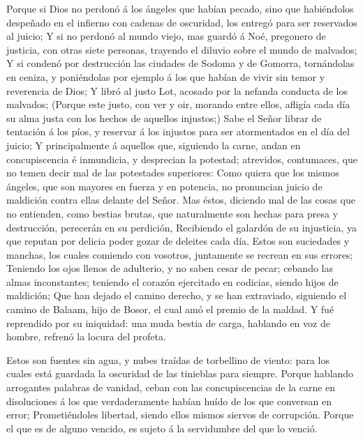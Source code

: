  Porque si Dios no perdonó á los ángeles que habían pecado,
sino que habiéndolos despeñado en el infierno con cadenas de oscuridad,
los entregó para ser reservados al juicio;  Y si no perdonó
al mundo viejo, mas guardó á Noé, pregonero de justicia, con otras siete
personas, trayendo el diluvio sobre el mundo de malvados;  Y
si condenó por destrucción las ciudades de Sodoma y de Gomorra,
tornándolas en ceniza, y poniéndolas por ejemplo á los que habían de
vivir sin temor y reverencia de Dios;  Y libró al justo Lot,
acosado por la nefanda conducta de los malvados;  (Porque
este justo, con ver y oir, morando entre ellos, afligía cada día su alma
justa con los hechos de aquellos injustos;)  Sabe el Señor
librar de tentación á los píos, y reservar á los injustos para ser
atormentados en el día del juicio;  Y principalmente á
aquellos que, siguiendo la carne, andan en concupiscencia é inmundicia,
y desprecian la potestad; atrevidos, contumaces, que no temen decir mal
de las potestades superiores:  Como quiera que los mismos
ángeles, que son mayores en fuerza y en potencia, no pronuncian juicio
de maldición contra ellas delante del Señor.  Mas éstos,
diciendo mal de las cosas que no entienden, como bestias brutas, que
naturalmente son hechas para presa y destrucción, perecerán en su
perdición,  Recibiendo el galardón de su injusticia, ya que
reputan por delicia poder gozar de deleites cada día. Estos son
suciedades y manchas, los cuales comiendo con vosotros, juntamente se
recrean en sus errores;  Teniendo los ojos llenos de
adulterio, y no saben cesar de pecar; cebando las almas inconstantes;
teniendo el corazón ejercitado en codicias, siendo hijos de maldición;
 Que han dejado el camino derecho, y se han extraviado,
siguiendo el camino de Balaam, hijo de Bosor, el cual amó el premio de
la maldad.  Y fué reprendido por su iniquidad: una muda
bestia de carga, hablando en voz de hombre, refrenó la locura del
profeta.

 Estos son fuentes sin agua, y nubes traídas de torbellino
de viento: para los cuales está guardada la oscuridad de las tinieblas
para siempre.  Porque hablando arrogantes palabras de
vanidad, ceban con las concupiscencias de la carne en disoluciones á los
que verdaderamente habían huído de los que conversan en error;
 Prometiéndoles libertad, siendo ellos mismos siervos de
corrupción. Porque el que es de alguno vencido, es sujeto á la
servidumbre del que lo venció.

